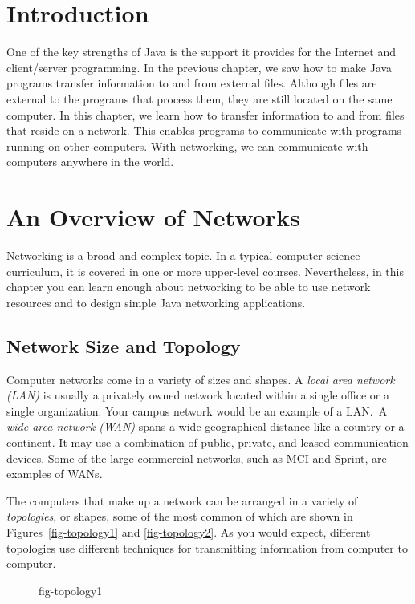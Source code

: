 \section{Introduction}

One of the key strengths of Java is the support it provides for the
Internet and client/server programming.  In the previous chapter, we saw
how to make Java programs transfer information to and from external
files.  Although files are external to the programs that process them,
they are still located on the same computer.  In this chapter, we learn
how to transfer information to and from files that reside on a
network.  This enables programs to communicate with programs running on
other computers.   With networking, we can communicate with computers
anywhere in the world.  

\section{An Overview of Networks}
\noindent Networking is a broad and complex topic.  In a typical computer science
curriculum, it is covered in one or more upper-level
courses.  Nevertheless, in this chapter you can learn enough about
networking to be able to use network resources and to design simple
Java networking applications.

\subsection{Network Size and Topology}
\noindent Computer networks come in a variety of sizes and shapes.  A {\it local
area network (LAN)} is usually a privately owned network located
within a single office or a single organization.  Your campus
network would be an example of a LAN.~A {\it wide area
network (WAN)} spans a wide geographical distance like a country
or a continent.  It may use a combination of public, private,
and leased communication devices.  Some of the large commercial
networks, such as MCI and Sprint, are examples of WANs.

The computers that make up a network can be arranged in a variety of
{\it topologies}, or shapes, some of the most common of which are
shown in Figures~\ref{fig-topology1} and \ref{fig-topology2}. 
As you
would expect, different topologies use different techniques for
transmitting information from computer to computer.
\begin{figure}[h]
 {fig-topology1}
\end{figure}

